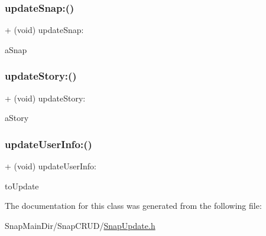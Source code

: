\subsubsection{\texorpdfstring{update\+Snap\+:()}{updateSnap:()}}
{\footnotesize\ttfamily + (void) update\+Snap\+: \begin{DoxyParamCaption}\item[{(\hyperlink{interface_snap}{Snap} $\ast$)}]{a\+Snap }\end{DoxyParamCaption}}

\hypertarget{interface_snap_update_a297dc954bce1692279760c0e586fc163}{}\label{interface_snap_update_a297dc954bce1692279760c0e586fc163} 
\subsubsection{\texorpdfstring{update\+Story\+:()}{updateStory:()}}
{\footnotesize\ttfamily + (void) update\+Story\+: \begin{DoxyParamCaption}\item[{(\hyperlink{interface_story}{Story} $\ast$)}]{a\+Story }\end{DoxyParamCaption}}

\hypertarget{interface_snap_update_a2f2313424326b8cca36b0377305fd558}{}\label{interface_snap_update_a2f2313424326b8cca36b0377305fd558} 
\subsubsection{\texorpdfstring{update\+User\+Info\+:()}{updateUserInfo:()}}
{\footnotesize\ttfamily + (void) update\+User\+Info\+: \begin{DoxyParamCaption}\item[{(\hyperlink{interface_user_info}{User\+Info} $\ast$)}]{to\+Update }\end{DoxyParamCaption}}



The documentation for this class was generated from the following file\+:\begin{DoxyCompactItemize}
\item 
Snap\+Main\+Dir/\+Snap\+C\+R\+U\+D/\hyperlink{_snap_update_8h}{Snap\+Update.\+h}\end{DoxyCompactItemize}
